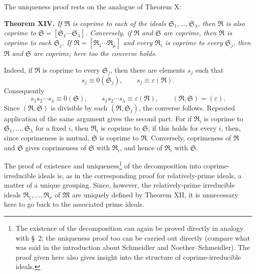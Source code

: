 \documentclass[11pt]{article}
\newcommand{\ideal}[1]{\mathfrak{#1}}
\begin{document}
The uniqueness proof rests on the analogue of Theorem X:

\textbf{Theorem XIV.} \emph{If $\ideal R$ is coprime to each of the ideals $\ideal S_1,
\ldots,\ideal S_\lambda$, then $\ideal R$ is also coprime to $\ideal S=[\ideal S_1\cdots\ideal S_\lambda]$. Conversely, if $\ideal R$ and $\ideal S$ are coprime, then $\ideal R$ is coprime to each $\ideal S_j$. If $\ideal R=[\ideal R_1\cdots\ideal R_\mu]$ and every $\ideal R_i$ is coprime to every $\ideal S_j$, then $\ideal R$ and $\ideal S$ are coprime; here too the converse holds.}

Indeed, if $\ideal R$ is coprime to every $\ideal S_j$, then there are elements $s_j$ such that
\[
 s_j\equiv0(\ideal S_j),
 \qquad
 s_j\equiv\varepsilon(\ideal R).
\]
Consequently
\[
 s_1s_2\cdots s_\lambda\equiv0(\ideal S),
 \qquad
 s_1s_2\cdots s_\lambda\equiv\varepsilon(\ideal R),
 \qquad
 (\ideal R,
\ideal S)=(\varepsilon).
\]
Since $(\ideal R,
\ideal S)$ is divisible by each $(\ideal R,
\ideal S_j)$, the converse follows. Repeated application of the same argument gives the second part. For if $\ideal R_i$ is coprime to $\ideal S_1,
\ldots,\ideal S_\lambda$ for a fixed $i$, then $\ideal R_i$ is coprime to $\ideal S$; if this holds for every $i$, then, since coprimeness is mutual, $\ideal S$ is coprime to $\ideal R$. Conversely, coprimeness of $\ideal R$ and $\ideal S$ gives coprimeness of $\ideal S$ with $\ideal R_i$, and hence of $\ideal R_i$ with $\ideal S$.

The proof of existence and uniqueness\footnote{The existence of the decomposition can again be proved directly in analogy with \S~2; the uniqueness proof too can be carried out directly (compare what was said in the introduction about Schmeidler and Noether--Schmeidler). The proof given here also gives insight into the structure of coprime-irreducible ideals.} of the decomposition into coprime-irreducible ideals is, as in the corresponding proof for relatively-prime ideals, a matter of a unique grouping. Since, however, the relatively-prime irreducible ideals $\ideal R_1,
\ldots,\ideal R_\sigma$ of $\ideal M$ are uniquely defined by Theorem XII, it is unnecessary here to go back to the associated prime ideals.
\end{document}

